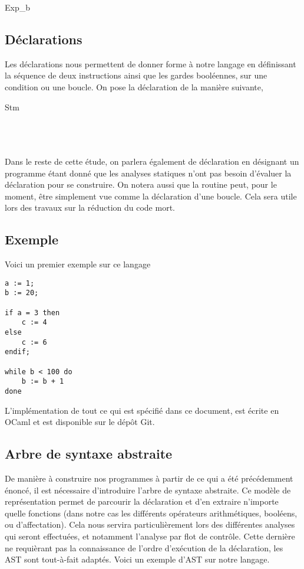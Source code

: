 \documentclass[a4paper, 11pt]{article}
\begin{document}
\begin{dtype}{Exp_b}
  \\
\end{dtype}

\subsection{Déclarations}
Les déclarations nous permettent de donner forme à notre langage en définissant la séquence de deux instructions ainsi
que les gardes booléennes, sur une condition ou une boucle. On pose la déclaration de la manière suivante,

\begin{dtype}{Stm}
  \\
  \\
  \akind{\sskip}\\
  \\
\end{dtype}
Dans le reste de cette étude, on parlera également de déclaration en désignant un programme étant donné que les analyses statiques
n'ont pas besoin d'évaluer la déclaration pour se construire. On notera aussi que la routine peut, pour le moment, être
simplement vue comme la déclaration d'une boucle. Cela sera utile lors des travaux sur la réduction du code mort.

\subsection{Exemple}
Voici un premier exemple sur ce langage
\begin{lstlisting}[tabsize=2]
a := 1;
b := 20;

if a = 3 then
	c := 4
else
	c := 6
endif;

while b < 100 do
	b := b + 1
done
\end{lstlisting}
L'implémentation de tout ce qui est spécifié dans ce document, est écrite en OCaml et est disponible sur le dépôt Git.

\subsection{Arbre de syntaxe abstraite}
De manière à construire nos programmes à partir de ce qui a été précédemment énoncé, il est nécessaire d'introduire 
l'arbre de syntaxe abstraite. Ce modèle de représentation permet de parcourir la déclaration et d'en extraire n'importe
quelle fonctions (dans notre cas les différents opérateurs arithmétiques, booléens, ou d'affectation). 
Cela nous servira particulièrement lors des différentes analyses qui seront effectuées, et notamment l'analyse par flot de contrôle. 
Cette dernière ne requièrant pas la connaissance de l'ordre d'exécution de la déclaration, les AST sont tout-à-fait adaptés.
Voici un exemple d'AST sur notre langage.
\end{document}
